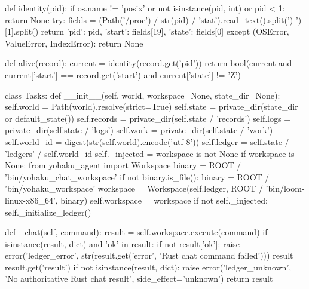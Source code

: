 def identity(pid):
    if os.name != 'posix' or not isinstance(pid, int) or pid < 1:
        return None
    try:
        fields = (Path('/proc') / str(pid) / 'stat').read_text().split(') ')[1].split()
        return {'pid': pid, 'start': fields[19], 'state': fields[0]}
    except (OSError, ValueError, IndexError):
        return None


def alive(record):
    current = identity(record.get('pid'))
    return bool(current and current['start'] == record.get('start') and current['state'] != 'Z')


class Tasks:
    def __init__(self, world, workspace=None, state_dir=None):
        self.world = Path(world).resolve(strict=True)
        self.state = private_dir(state_dir or default_state())
        self.records = private_dir(self.state / 'records')
        self.logs = private_dir(self.state / 'logs')
        self.work = private_dir(self.state / 'work')
        self.world_id = digest(str(self.world).encode('utf-8'))
        self.ledger = self.state / 'ledgers' / self.world_id
        self._injected = workspace is not None
        if workspace is None:
            from yohaku_agent import Workspace
            binary = ROOT / 'bin/yohaku_chat_workspace'
            if not binary.is_file():
                binary = ROOT / 'bin/yohaku_workspace'
            workspace = Workspace(self.ledger, ROOT / 'bin/loom-linux-x86_64', binary)
        self.workspace = workspace
        if not self._injected:
            self._initialize_ledger()

    def _chat(self, command):
        result = self.workspace.execute(command)
        if isinstance(result, dict) and 'ok' in result:
            if not result['ok']:
                raise error('ledger_error', str(result.get('error', 'Rust chat command failed')))
            result = result.get('result')
        if not isinstance(result, dict):
            raise error('ledger_unknown', 'No authoritative Rust chat result', side_effect='unknown')
        return result

